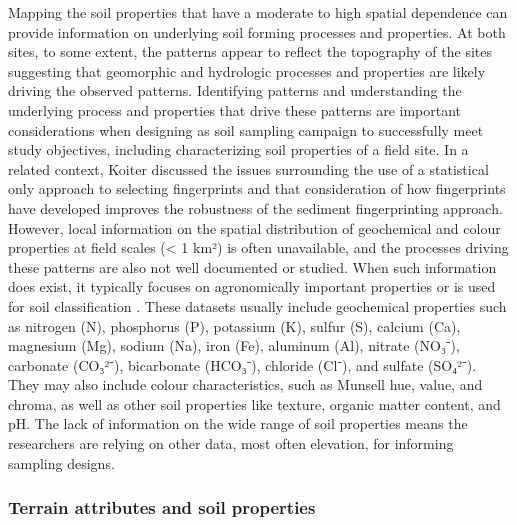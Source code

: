 \documentclass[
  number]{elsarticle}
\begin{document}
Mapping the soil properties that have a moderate to high spatial
dependence can provide information on underlying soil forming processes
and properties. At both sites, to some extent, the patterns appear to
reflect the topography of the sites suggesting that geomorphic and
hydrologic processes and properties are likely driving the observed
patterns. Identifying patterns and understanding the underlying process
and properties that drive these patterns are important considerations
when designing as soil sampling campaign to successfully meet study
objectives, including characterizing soil properties of a field site. In
a related context, Koiter \citep{koiter2013a} discussed the issues
surrounding the use of a statistical only approach to selecting
fingerprints and that consideration of how fingerprints have developed
improves the robustness of the sediment fingerprinting approach.
However, local information on the spatial distribution of geochemical
and colour properties at field scales (\textless{} 1 km²) is often
unavailable, and the processes driving these patterns are also not well
documented or studied. When such information does exist, it typically
focuses on agronomically important properties \citep[e.g.,][]{mzuku2005}
or is used for soil classification
\citep[e.g.,][]{soilclassificationworkinggroup1998}. These datasets
usually include geochemical properties such as nitrogen (N), phosphorus
(P), potassium (K), sulfur (S), calcium (Ca), magnesium (Mg), sodium
(Na), iron (Fe), aluminum (Al), nitrate (NO₃⁻), carbonate (CO₃²⁻),
bicarbonate (HCO₃⁻), chloride (Cl⁻), and sulfate (SO₄²⁻). They may also
include colour characteristics, such as Munsell hue, value, and chroma,
as well as other soil properties like texture, organic matter content,
and pH. The lack of information on the wide range of soil properties
means the researchers are relying on other data, most often elevation,
for informing sampling designs.

\subsubsection{Terrain attributes and soil
properties}\label{terrain-attributes-and-soil-properties}
\end{document}
